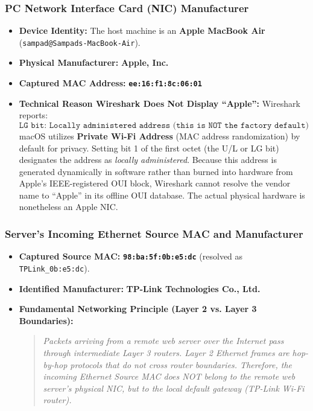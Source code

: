 \documentclass[11pt,a4paper]{article}
\begin{document}
\subsubsection{PC Network Interface Card (NIC) Manufacturer}
\begin{itemize}[leftmargin=*]
    \item \textbf{Device Identity:} The host machine is an \textbf{Apple MacBook Air} (\texttt{sampad@Sampads-MacBook-Air}).
    \item \textbf{Physical Manufacturer:} \textbf{Apple, Inc.}
    \item \textbf{Captured MAC Address:} \texttt{\textbf{ee:16:f1:8c:06:01}}
    \item \textbf{Technical Reason Wireshark Does Not Display ``Apple'':}
    Wireshark reports:
    $$\texttt{LG bit: Locally administered address (this is NOT the factory default)}$$
    macOS utilizes \textbf{Private Wi-Fi Address} (MAC address randomization) by default for privacy. Setting bit 1 of the first octet (the U/L or LG bit) designates the address as \textit{locally administered}. Because this address is generated dynamically in software rather than burned into hardware from Apple's IEEE-registered OUI block, Wireshark cannot resolve the vendor name to ``Apple'' in its offline OUI database. The actual physical hardware is nonetheless an Apple NIC.
\end{itemize}

\subsubsection{Server's Incoming Ethernet Source MAC and Manufacturer}
\begin{itemize}[leftmargin=*]
    \item \textbf{Captured Source MAC:} \texttt{\textbf{98:ba:5f:0b:e5:dc}} (resolved as \texttt{TPLink\_0b:e5:dc}).
    \item \textbf{Identified Manufacturer:} \textbf{TP-Link Technologies Co., Ltd.}
    \item \textbf{Fundamental Networking Principle (Layer 2 vs. Layer 3 Boundaries):}
    \begin{quote}
    \textit{Packets arriving from a remote web server over the Internet pass through intermediate Layer 3 routers. Layer 2 Ethernet frames are hop-by-hop protocols that do not cross router boundaries. Therefore, the incoming Ethernet Source MAC does NOT belong to the remote web server's physical NIC, but to the local default gateway (TP-Link Wi-Fi router).}
    \end{quote}
\end{itemize}
\end{document}
